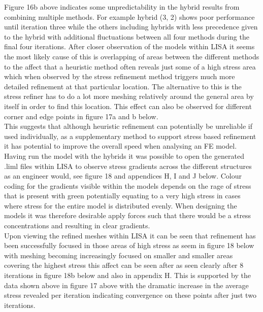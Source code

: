 \noindent
Figure 16b above indicates some unpredictability in the hybrid results from combining multiple methods. For example hybrid (3, 2) shows poor performance until iteration three while the others including hybrids with less precedence given to the hybrid with additional fluctuations between all four methods during the final four iterations. After closer observation of the models within LISA it seems the most likely cause of this is overlapping of areas between the different methods to the affect that a heuristic method often reveals just some of a high stress area which when observed by the stress refinement method triggers much more detailed refinement at that particular location. 
The alternative to this is the stress refiner has to do a lot more meshing relatively around the general area by itself in order to find this location. This effect can also be observed for different corner and edge points in figure 17a and b below. \\

\noindent
This suggests that although heuristic refinement can potentially be unreliable if used individually, as a supplementary method to support stress based refinement it has potential to improve the overall speed when analysing an FE model. \\

\noindent
Having run the model with the hybrids it was possible to open the generated .liml files within LISA to observe stress gradients across the different structures as an engineer would, see figure 18 and appendices H, I and J below. Colour coding for the gradients visible within the models depends on the rage of stress that is present with green potentially equating to a very high stress in cases where stress for the entire model is distributed evenly. When designing the models it was therefore desirable apply forces such that there would be a stress concentrations and resulting in clear gradients. \\ 

\noindent
Upon viewing the refined meshes within LISA it can be seen that refinement has been successfully focused in those areas of high stress as seem in figure 18 below with meshing becoming increasingly focused on smaller and smaller areas covering the highest stress this affect can be seen after as seen clearly after 8 iterations in figure 18b below and also in appendix H. This is supported by the data shown above in figure 17 above with the dramatic increase in the average stress revealed per iteration indicating convergence on these points after just two iterations. \\ 

